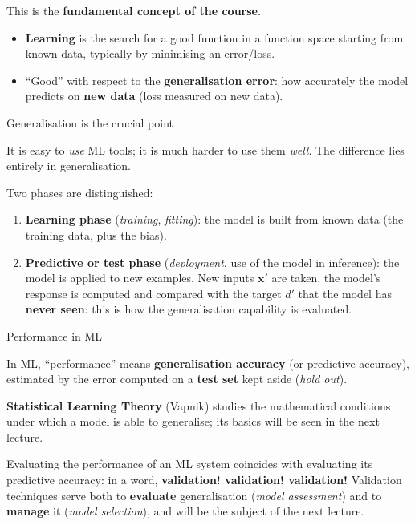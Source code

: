 This is the \textbf{fundamental concept of the course}.

\begin{itemize}
\tightlist
\item
  \textbf{Learning} is the search for a good function in a function
  space starting from known data, typically by minimising an
  error/loss.
\item
  ``Good'' with respect to the \textbf{generalisation error}: how
  accurately the model predicts on \textbf{new data} (loss measured on
  new data).
\end{itemize}

\begin{boxwarning}{Generalisation is the crucial point}

It is easy to \emph{use} ML tools; it is much harder to use them
\emph{well}. The difference lies entirely in generalisation.

\end{boxwarning}

Two phases are distinguished:

\begin{enumerate}
\def\labelenumi{\arabic{enumi}.}
\tightlist
\item
  \textbf{Learning phase} (\emph{training}, \emph{fitting}): the model
  is built from known data (the training data, plus the bias).
\item
  \textbf{Predictive or test phase} (\emph{deployment}, use of the
  model in inference): the model is applied to new examples. New inputs
  \(\mathbf{x}'\) are taken, the model's response is computed and
  compared with the target \(d'\) that the model has \textbf{never
  seen}: this is how the generalisation capability is evaluated.
\end{enumerate}

\begin{boxnote}{Performance in ML}

In ML, ``performance'' means \textbf{generalisation accuracy} (or
predictive accuracy), estimated by the error computed on a
\textbf{test set} kept aside (\emph{hold out}).

\end{boxnote}

\textbf{Statistical Learning Theory} (Vapnik) studies the mathematical
conditions under which a model is able to generalise; its basics will
be seen in the next lecture.

Evaluating the performance of an ML system coincides with evaluating
its predictive accuracy: in a word, \textbf{validation! validation!
validation!} Validation techniques serve both to \textbf{evaluate}
generalisation (\emph{model assessment}) and to \textbf{manage} it
(\emph{model selection}), and will be the subject of the next lecture.

